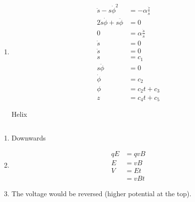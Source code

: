 \documentclass{article}
\begin{document}
\begin{enumerate}
  \item

        \begin{align*}
          \ddot{s} - s \dot{\phi}^2            & = -\alpha \frac{\dot{z}}{s} \\
          2 \dot{s} \dot{\phi} + s \ddot{\phi} & = 0                         \\
          0                                    & = \alpha \frac{\dot{s}}{s}  \\
          \dot{s}                              & = 0                         \\
          \ddot{s}                             & = 0                         \\
          s                                    & = c_1                       \\
          s \ddot{\phi}                        & = 0                         \\
          \dot{\phi}                           & = c_2                       \\
          \phi                                 & = c_2 t + c_3               \\
          z                                    & = c_4 t + c_5
        \end{align*}

        Helix
\end{enumerate}

\setcounter{subsection}{40}
\subsection{}

\begin{enumerate}
  \item Downwards

  \item

        \begin{align*}
          q E & = q v B \\
          E   & = v B   \\
          V   & = E t   \\
              & = v B t
        \end{align*}

  \item The voltage would be reversed (higher potential at the top).
\end{enumerate}

\subsection{}
\end{document}
